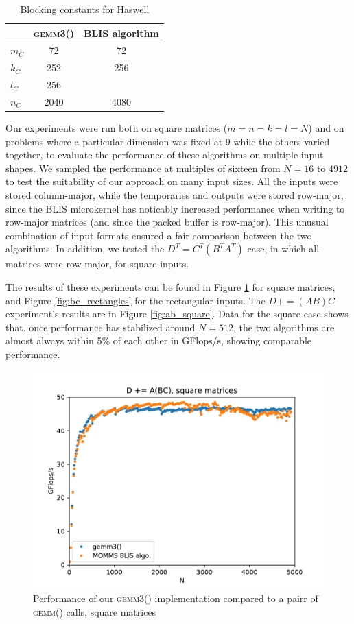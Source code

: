 \documentclass[12pt]{article}
\newcommand*{\pluseq}{\mathrel{{+}{=}}}
\newcommand*{\gemmt}{{\textsc{gemm3()}}}
\newcommand*{\gemm}{{\textsc{gemm()}}}
\begin{document}
\begin{table}
  \centering
  \begin{tabular}{l|c c}
    &\gemmt{}&BLIS algorithm\\ \hline
    $m_C$&72&72\\
    $k_C$&252&256\\
    $l_C$&256&\\
    $n_C$&2040&4080\\
  \end{tabular}
  \caption{Blocking constants for Haswell}
  \label{tab:constants}
\end{table}

Our experiments were run both on square matrices ($m = n = k = l = N$) and on problems where a particular dimension was fixed at $9$ while the others varied together, to evaluate the performance of these algorithms on multiple input shapes.
We sampled the performance at multiples of sixteen from $N = 16$ to $4912$ to test the suitability of our approach on many input sizes.
All the inputs were stored column-major, while the temporaries and outputs were stored row-major, since the BLIS microkernel has noticably increased performance when writing to row-major matrices (and since the packed buffer is row-major).
This unusual combination of input formats ensured a fair comparison between the two algorithms.
In addition, we tested the $D^T = C^T(B^TA^T)$ case, in which all matrices were row major, for square inputs.

The results of these experiments can be found in Figure \ref{fig:bc_square} for square matrices, and Figure \ref{fig:bc_rectangles} for the rectangular inputs.
The $D \pluseq (AB)C$ experiment's results are in Figure \ref{fig:ab_square}.
Data for the square case shows that, once performance has stabilized around $N = 512$, the two algorithms are almost always within 5\% of each other in GFlops/s, showing comparable performance.

\begin{figure}
  \centering
  \includegraphics[height=0.40\textheight]{../results/earwig2/gemm3}
  \caption{Performance of our \gemmt{} implementation compared to a pairr of \gemm{} calls, square matrices}
  \label{fig:bc_square}
\end{figure}
\end{document}
